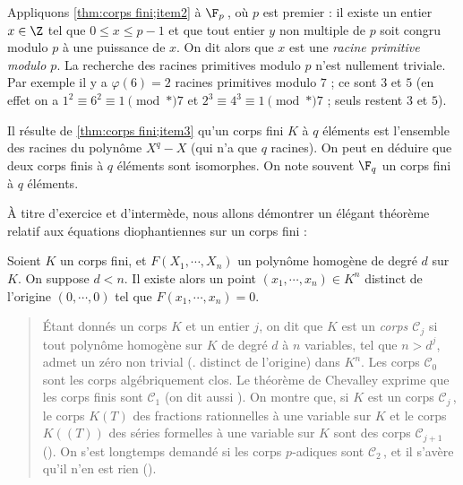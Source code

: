 \documentclass[11pt, %
  title in boldface,
  theorem in new line,
  theorem numbering = section,
  number theorems separately,
  simple name,
]{beaulivre}
\begin{document}
    \begin{example}
        Appliquons \ref{thm:corps fini;item2} à \( \F_p \)\,, où \( p \) est premier : il existe un entier \( x \in \Z \) tel que \( 0 \leqslant x \leqslant p-1 \) et que tout entier \( y \) non multiple de \( p \) soit congru modulo \( p \) à une puissance de \( x \). On dit alors que \( x \) est une \emph{racine primitive modulo \( p \)}. La recherche des racines primitives modulo \( p \) n'est nullement triviale. Par exemple il y a \( \varphi(6) = 2 \) racines primitives modulo \( 7 \) ; ce sont \( 3 \) et \( 5 \) (en effet on a \( 1^2 \equiv 6^2 \equiv 1 \pmod*{7} \) et \( 2^3 \equiv 4^3\equiv 1 \pmod*{7} \) ; seuls restent \( 3 \) et \( 5 \)).
    \end{example}

    \begin{remark}
        Il résulte de \ref{thm:corps fini;item3} qu'un corps fini \( K \) à \( q \) éléments est l'ensemble des racines du polynôme \( X^q - X \) (qui n'a que \( q \) racines). On peut en déduire que deux corps finis à \( q \) éléments sont isomorphes. On note souvent \( \F_q \) un corps fini à \( q \) éléments.
    \end{remark}

    À titre d'exercice et d'intermède, nous allons démontrer un élégant théorème relatif aux équations diophantiennes sur un corps fini :

    \begin{theorem}[Chevalley]\label{thm:Chevalley;corps fini}
        Soient \( K \) un corps fini, et \( F(X_1, \cdots, X_n) \) un polynôme homogène de degré \( d \) sur \( K \). On suppose \( d < n \). Il existe alors un point \( (x_1, \cdots, x_n) \in K^n \) distinct de l'origine \( (0, \cdots, 0) \) tel que \( F(x_1, \cdots, x_n) = 0 \).
    \end{theorem}

    \begin{quote}
        Étant donnés un corps \( K \) et un entier \( j \), on dit que \( K \) est un \emph{corps \( \mathscr{C}_j \)} si tout polynôme homogène sur \( K \) de degré \( d \) à \( n \) variables, tel que \( n > d^j \), admet un zéro non trivial (\ie. distinct de l'origine) dans \( K^n \). Les corps \( \mathscr{C}_0 \) sont les corps algébriquement clos. Le théorème de Chevalley exprime que les corps finis sont \( \mathscr{C}_1 \) (on dit aussi ). On montre que, si \( K \) est un corps \( \mathscr{C}_j \)\,, le corps \( K(T) \) des fractions rationnelles à une variable sur \( K \) et le corps \( K(\!\!(T)\!\!) \) des séries formelles à une variable sur \( K \) sont des corps \( \mathscr{C}_{j+1} \) (\cite{lang1962}). On s'est longtemps demandé si les corps \( p \)‑adiques sont \( \mathscr{C}_2 \)\,, et il s'avère qu'il n'en est rien (\cite{terjanian1966}).
    \end{quote}
\end{document}
